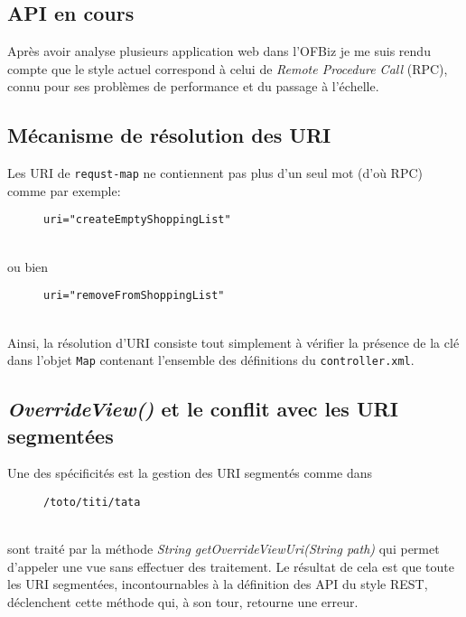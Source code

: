 \subsection{API en cours}
Après avoir analyse plusieurs application web dans l'OFBiz je me suis rendu compte que le style actuel correspond à celui de \emph{Remote Procedure Call }(RPC), connu pour ses problèmes de performance et du passage à l'échelle. 

\subsection{Mécanisme de résolution des URI}
Les URI de \verb|requst-map| ne contiennent pas plus d'un seul mot (d'où RPC) comme par exemple:
\begin{figure}[h!]
	\begin{lstlisting}[frame=leftline]
uri="createEmptyShoppingList"
	\end{lstlisting}
\end{figure}\\
ou bien \\
\begin{figure}[h!]
	\begin{lstlisting}[frame=leftline]
uri="removeFromShoppingList"
	\end{lstlisting}
\end{figure}\\
Ainsi, la résolution d'URI consiste  tout simplement  à vérifier la présence de la clé dans l'objet \verb|Map| contenant l'ensemble des définitions du \verb|controller.xml|.
    


\subsection{\textit{OverrideView()} et le conflit avec les URI segmentées}
Une des spécificités est la gestion des URI segmentés comme dans \\
\begin{figure}[h!]
	\begin{lstlisting}[frame=leftline]
/toto/titi/tata
	\end{lstlisting}
\end{figure}\\
 sont traité par la méthode \emph{String getOverrideViewUri(String path)} qui permet d'appeler une vue sans effectuer des traitement. Le résultat de cela est que toute les URI segmentées, incontournables à la définition des API du style REST, déclenchent cette méthode qui, à son tour, retourne une erreur. 

